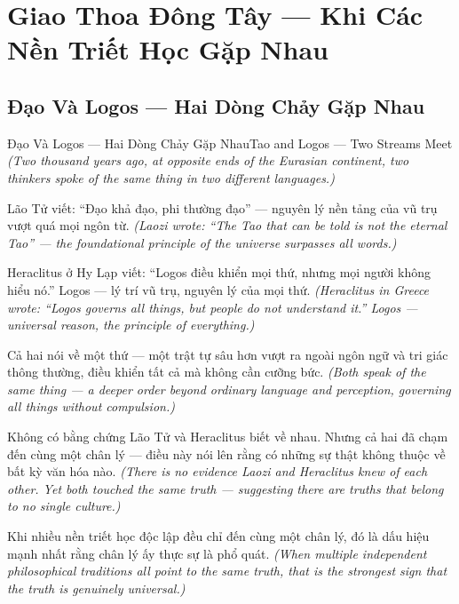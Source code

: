 \chapter{Giao Thoa Đông Tây — Khi Các Nền Triết Học Gặp Nhau}

\section{Đạo Và Logos — Hai Dòng Chảy Gặp Nhau}
\begin{truyen}{Đạo Và Logos — Hai Dòng Chảy Gặp Nhau}{Tao and Logos — Two Streams Meet}
\textit{(Two thousand years ago, at opposite ends of the Eurasian continent, two thinkers spoke of the same thing in two different languages.)}

Lão Tử viết: ``Đạo khả đạo, phi thường đạo'' — nguyên lý nền tảng của vũ trụ vượt quá mọi ngôn từ.
\textit{(Laozi wrote: ``The Tao that can be told is not the eternal Tao'' — the foundational principle of the universe surpasses all words.)}

Heraclitus ở Hy Lạp viết: ``Logos điều khiển mọi thứ, nhưng mọi người không hiểu nó.'' Logos — lý trí vũ trụ, nguyên lý của mọi thứ.
\textit{(Heraclitus in Greece wrote: ``Logos governs all things, but people do not understand it.'' Logos — universal reason, the principle of everything.)}

Cả hai nói về một thứ — một trật tự sâu hơn vượt ra ngoài ngôn ngữ và tri giác thông thường, điều khiển tất cả mà không cần cưỡng bức.
\textit{(Both speak of the same thing — a deeper order beyond ordinary language and perception, governing all things without compulsion.)}

Không có bằng chứng Lão Tử và Heraclitus biết về nhau. Nhưng cả hai đã chạm đến cùng một chân lý — điều này nói lên rằng có những sự thật không thuộc về bất kỳ văn hóa nào.
\textit{(There is no evidence Laozi and Heraclitus knew of each other. Yet both touched the same truth — suggesting there are truths that belong to no single culture.)}

\end{truyen}

\begin{baihoc}
Khi nhiều nền triết học độc lập đều chỉ đến cùng một chân lý, đó là dấu hiệu mạnh nhất rằng chân lý ấy thực sự là phổ quát.
\textit{(When multiple independent philosophical traditions all point to the same truth, that is the strongest sign that the truth is genuinely universal.)}
\end{baihoc}
\ngancach


